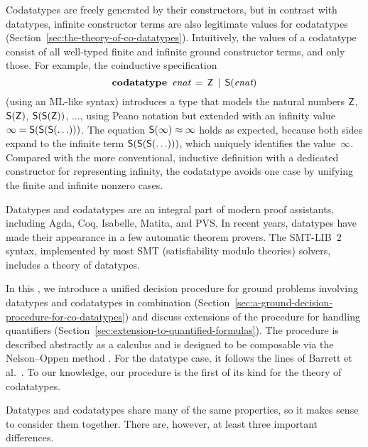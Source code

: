 Codatatypes are freely generated by their constructors, but in contrast with datatypes,
infinit\-e constructor terms are also legitimate values for codatatypes
(Section~\ref{sec:the-theory-of-co-datatypes}). Intuitively, the
values of a codatatype consist of all well-typed finite and infinite ground
constructor
terms, and only those. For example, the coinductive specification
%
\[\textbf{codatatype}~\,\textit{enat} \,=\, \textsf{Z} \,\mid\, \textsf{S}(\textit{enat})\]
%
(using an ML-like syntax) introduces a type that
models the natural numbers $\textsf{Z}$, $\textsf{S}(\textsf{Z})$, $\textsf{S}(\textsf{S}(\textsf{Z}))$, $\ldots$\afterLdots{},
using Peano notation but extended with an
infinity value $\infty = \textsf{S}(\textsf{S}(\textsf{S}(\ldots)))$.
The equation $\textsf{S}(\infty) \approx \infty$ holds as expected,
because both sides expand to the infinite term
$\textsf{S}(\textsf{S}(\textsf{S}(\ldots)))$, which uniquely identifies the
value~$\infty$.
Compared
with the more conventional, inductive definition with a dedicated constructor
for representing infinity,
%
the codatatype avoids one case by unifying the finite and infinite nonzero cases.

\nopagebreak

Datatypes and codatatypes are an integral part of modern proof assistants,
including Agda, Coq, Isabelle, Matita, and PVS. In recent years, datatypes
have made their appearance in a few automatic theorem provers. The SMT-LIB~2
\cite{barrett-et-al-2010} syntax, implemented by most SMT (satisfiability
modulo theories) solvers, includes a theory of datatypes.

\pagebreak

In this \thewordpaper, we introduce a unified decision procedure for ground
problems involving datatypes and codatatypes in combination
(Section~\ref{sec:a-ground-decision-procedure-for-co-datatypes})
and discuss extensions  of the procedure for handling quantifiers
(Section~\ref{sec:extension-to-quantified-formulas}).
The procedure is described abstractly as a calculus and is
designed to be composable via the Nelson--Oppen method \cite{nelson-oppen-1979}.
For the datatype case, it follows the lines of Barrett et al.\ \cite{barrett-et-al-2007}.
To our knowledge, our procedure is the first of its kind for the theory of
codatatypes.

Datatypes and codatatypes share many of the same properties, so it makes sense
to consider them together. There are, however, at least three important
differences.

